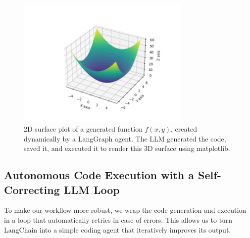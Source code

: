 %
\begin{figure}[h]
\centering
\includegraphics[width=0.75\textwidth]{images/my2d.png}
\caption{2D surface plot of a generated function \( f(x, y) \), created dynamically by a LangGraph agent. The LLM generated the code, saved it, and executed it to render this 3D surface using matplotlib.}
\label{fig:langgraph-2d-function}
\end{figure}

%
\subsection*{Autonomous Code Execution with a Self-Correcting LLM Loop}

To make our workflow more robust, we wrap the code generation and execution in a loop that automatically retries in case of errors. This allows us to turn LangChain into a simple coding agent that iteratively improves its output.

